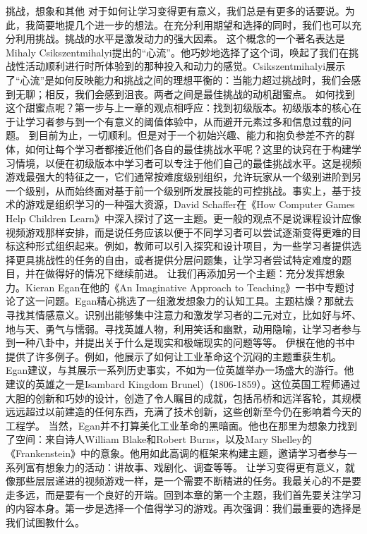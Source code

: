 挑战，想象和其他
对于如何让学习变得更有意义，我们总是有更多的话要说。为此，我简要地提几个进一步的想法。在充分利用期望和选择的同时，我们也可以充分利用挑战。挑战的水平是激发动力的强大因素。
这个概念的一个著名表达是Mihaly Csikszentmihalyi提出的“心流”。他巧妙地选择了这个词，唤起了我们在挑战性活动顺利进行时所体验到的那种投入和动力的感觉。Csikszentmihalyi展示了“心流”是如何反映能力和挑战之间的理想平衡的：当能力超过挑战时，我们会感到无聊；相反，我们会感到沮丧。两者之间是最佳挑战的动机甜蜜点。
如何找到这个甜蜜点呢？第一步与上一章的观点相呼应：找到初级版本。初级版本的核心在于让学习者参与到一个有意义的阈值体验中，从而避开元素过多和信息过载的问题。
到目前为止，一切顺利。但是对于一个初始兴趣、能力和抱负参差不齐的群体，如何让每个学习者都接近他们各自的最佳挑战水平呢？这里的诀窍在于构建学习情境，以便在初级版本中学习者可以专注于他们自己的最佳挑战水平。这是视频游戏最强大的特征之一，它们通常按难度级别组织，允许玩家从一个级别进阶到另一个级别，从而始终面对基于前一个级别所发展技能的可控挑战。事实上，基于技术的游戏是组织学习的一种强大资源，David Schaffer在《How Computer Games Help Children Learn》中深入探讨了这一主题。更一般的观点不是说课程设计应像视频游戏那样安排，而是说任务应该以便于不同学习者可以尝试逐渐变得更难的目标这种形式组织起来。例如，教师可以引入探究和设计项目，为一些学习者提供选择更具挑战性的任务的自由，或者提供分层问题集，让学习者尝试特定难度的题目，并在做得好的情况下继续前进。
让我们再添加另一个主题：充分发挥想象力。Kieran Egan在他的《An Imaginative Approach to Teaching》一书中专题讨论了这一问题。Egan精心挑选了一组激发想象力的认知工具。主题枯燥？那就去寻找其情感意义。识别出能够集中注意力和激发学习者的二元对立，比如好与坏、地与天、勇气与懦弱。寻找英雄人物，利用笑话和幽默，动用隐喻，让学习者参与到一种八卦中，并提出关于什么是现实和极端现实的问题等等。
伊根在他的书中提供了许多例子。例如，他展示了如何让工业革命这个沉闷的主题重获生机。Egan建议，与其展示一系列历史事实，不如为一位英雄举办一场盛大的游行。他建议的英雄之一是Isambard Kingdom Brunel)（1806-1859）。这位英国工程师通过大胆的创新和巧妙的设计，创造了令人瞩目的成就，包括吊桥和远洋客轮，其规模远远超过以前建造的任何东西，充满了技术创新，这些创新至今仍在影响着今天的工程学。
当然，Egan并不打算美化工业革命的黑暗面。他也在那里为想象力找到了空间：来自诗人William Blake和Robert Burns，以及Mary Shelley的《Frankenstein》中的意象。他用如此高调的框架来构建主题，邀请学习者参与一系列富有想象力的活动：讲故事、戏剧化、调查等等。
让学习变得更有意义，就像那些层层递进的视频游戏一样，是一个需要不断精进的任务。我最关心的不是要走多远，而是要有一个良好的开端。回到本章的第一个主题，我们首先要关注学习的内容本身。第一步是选择一个值得学习的游戏。再次强调：我们最重要的选择是我们试图教什么。

